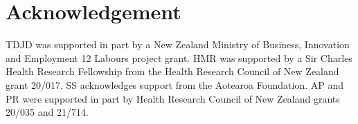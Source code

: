 \documentclass[fleqn,10pt]{physiome}
\begin{document}
\section{Acknowledgement}
TDJD was supported in part by a New Zealand Ministry of Business, Innovation and Employment 12 Labours project grant. HMR was supported by a Sir Charles Health Research Fellowship from the Health Research Council of New Zealand grant 20/017. SS acknowledges support from the Aotearoa Foundation. AP and PR were supported in part by Health Research Council of New Zealand grants 20/035 and 21/714.

\end{document}
